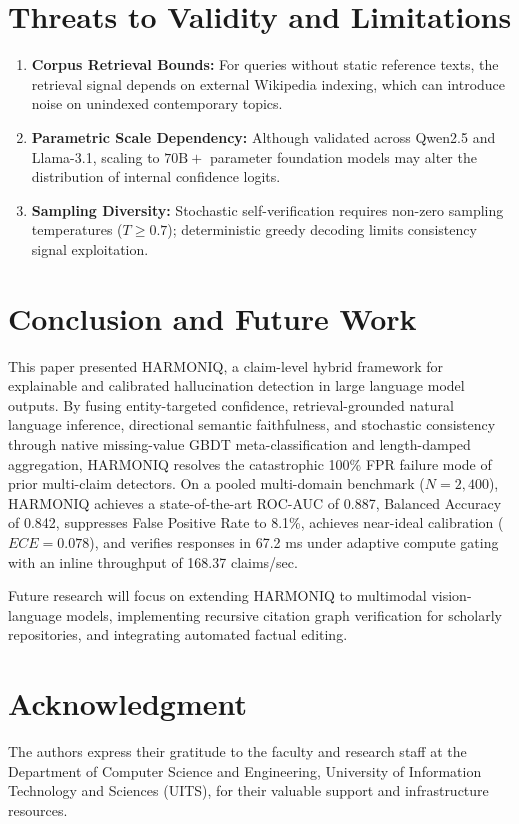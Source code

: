\documentclass[conference]{IEEEtran}
\begin{document}
\section{Threats to Validity and Limitations}
\begin{enumerate}
    \item \textbf{Corpus Retrieval Bounds:} For queries without static reference texts, the retrieval signal depends on external Wikipedia indexing, which can introduce noise on unindexed contemporary topics.
    \item \textbf{Parametric Scale Dependency:} Although validated across Qwen2.5 and Llama-3.1, scaling to $70\text{B}+$ parameter foundation models may alter the distribution of internal confidence logits.
    \item \textbf{Sampling Diversity:} Stochastic self-verification requires non-zero sampling temperatures ($T \ge 0.7$); deterministic greedy decoding limits consistency signal exploitation.
\end{enumerate}

\section{Conclusion and Future Work}
This paper presented HARMONIQ, a claim-level hybrid framework for explainable and calibrated hallucination detection in large language model outputs. By fusing entity-targeted confidence, retrieval-grounded natural language inference, directional semantic faithfulness, and stochastic consistency through native missing-value GBDT meta-classification and length-damped aggregation, HARMONIQ resolves the catastrophic 100\% FPR failure mode of prior multi-claim detectors. On a pooled multi-domain benchmark ($N = 2,400$), HARMONIQ achieves a state-of-the-art ROC-AUC of 0.887, Balanced Accuracy of 0.842, suppresses False Positive Rate to 8.1\%, achieves near-ideal calibration ($ECE = 0.078$), and verifies responses in 67.2 ms under adaptive compute gating with an inline throughput of 168.37 claims/sec.

Future research will focus on extending HARMONIQ to multimodal vision-language models, implementing recursive citation graph verification for scholarly repositories, and integrating automated factual editing.

\section*{Acknowledgment}
The authors express their gratitude to the faculty and research staff at the Department of Computer Science and Engineering, University of Information Technology and Sciences (UITS), for their valuable support and infrastructure resources.
\end{document}

